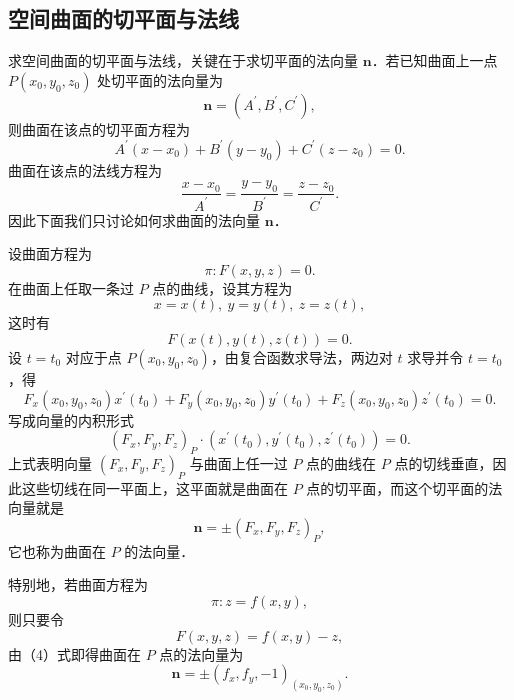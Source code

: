 \subsection{空间曲面的切平面与法线}

求空间曲面的切平面与法线，关键在于求切平面的法向量 $\bm{n}$．若已知曲面上一点 $P(x_{0},y_{0},z_{0})$ 处切平面的法向量为
\[
\bm{n}=(A^{\prime},B^{\prime},C^{\prime}),
\]
则曲面在该点的切平面方程为
\[
A^{\prime}(x-x_{0})+B^{\prime}(y-y_{0})+C^{\prime}(z-z_{0})=0.
\]
曲面在该点的法线方程为
\[
\frac{x-x_{0}}{A^{\prime}}=\frac{y-y_{0}}{B^{\prime}}=\frac{z-z_{0}}{C^{\prime}}.
\]
因此下面我们只讨论如何求曲面的法向量 $\bm{n}$．

设曲面方程为
\[
\pi\colon F(x,y,z)=0.
\]
在曲面上任取一条过 $P$ 点的曲线，设其方程为
\[
x=x(t),\ y=y(t),\ z=z(t),
\]
这时有
\[
F(x(t),y(t),z(t))=0.
\]
设 $t=t_{0}$ 对应于点 $P(x_{0},y_{0},z_{0})$，由复合函数求导法，两边对 $t$ 求导并令 $t=t_{0}$，得
\[
F_{x}(x_{0},y_{0},z_{0})x^{\prime}(t_{0})+F_{y}(x_{0},y_{0},z_{0})y^{\prime}(t_{0})+F_{z}(x_{0},y_{0},z_{0})z^{\prime}(t_{0})=0.
\]
写成向量的内积形式
\[
(F_{x},F_{y},F_{z})_{P}\cdot(x^{\prime}(t_{0}),y^{\prime}(t_{0}),z^{\prime}(t_{0}))=0.
\]
上式表明向量 $(F_{x},F_{y},F_{z})_{P}$ 与曲面上任一过 $P$ 点的曲线在 $P$ 点的切线垂直，因此这些切线在同一平面上，这平面就是曲面在 $P$ 点的切平面，而这个切平面的法向量就是
\begin{equation}
\bm{n}=\pm(F_{x},F_{y},F_{z})_{P},
\tag{4}
\end{equation}
它也称为曲面在 $P$ 的法向量．

特别地，若曲面方程为
\[
\pi\colon z=f(x,y),
\]
则只要令
\[
F(x,y,z)=f(x,y)-z,
\]
由（4）式即得曲面在 $P$ 点的法向量为
\begin{equation}
\bm{n}=\pm\left(f_{x},f_{y},-1\right)_{(x_{0},y_{0},z_{0})}.
\tag{5}
\end{equation}

